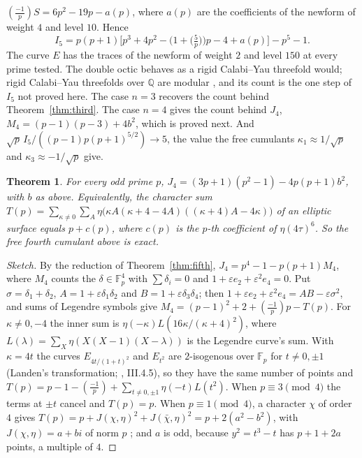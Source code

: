 \documentclass[11pt]{article}
\newtheorem{theorem}{Theorem}
\theoremstyle{remark}
\begin{document}
$(\tfrac{-1}{p})S=6p^2-19p-a(p)$, where $a(p)$ are the coefficients of the newform of
weight $4$ and level $10$. Hence
\[
I_5=p(p+1)\Big[p^3+4p^2-\big(1+\big(\tfrac5p\big)\big)p-4+a(p)\Big]-p^5-1 .
\]
The curve $E$ has the traces of the newform of weight $2$ and level $150$ at every prime tested. The double octic
behaves as a rigid Calabi--Yau threefold would; rigid Calabi--Yau threefolds over $\mathbb Q$ are modular
\cite{GouveaYui2011}, and its count is the one step of $I_5$ not proved here. The case $n=3$ recovers the count behind
Theorem~\ref{thm:third}. The case $n=4$ gives the count behind $J_4$, $M_4=(p-1)(p-3)+4b^2$, which is proved next. And
$\sqrt p\,I_5/((p-1)p(p+1)^{5/2})\to5$, the value the free cumulants $\kappa_1\approx1/\sqrt p$ and
$\kappa_3\approx-1/\sqrt p$ give.

\begin{theorem}\label{thm:fourth}
For every odd prime $p$, $J_4=(3p+1)(p^2-1)-4p(p+1)b^2$, with $b$ as above. Equivalently, the character sum
$T(p)=\sum_{\kappa\ne0}\sum_{A}\eta\big(\kappa A(\kappa+4-4A)((\kappa+4)A-4\kappa)\big)$ of an elliptic surface equals
$p+c(p)$, where $c(p)$ is the $p$-th coefficient of $\eta(4\tau)^6$. So the free fourth cumulant above is exact.
\end{theorem}
\begin{proof}[Sketch]
By the reduction of Theorem~\ref{thm:fifth}, $J_4=p^4-1-p(p+1)M_4$, where $M_4$ counts the $\delta\in\mathbb F_p^4$
with $\sum\delta_i=0$ and $1+\varepsilon e_2+\varepsilon^2e_4=0$. Put $\sigma=\delta_1+\delta_2$,
$A=1+\varepsilon\delta_1\delta_2$ and $B=1+\varepsilon\delta_3\delta_4$; then $1+\varepsilon e_2+\varepsilon^2e_4=
AB-\varepsilon\sigma^2$, and sums of Legendre symbols give $M_4=(p-1)^2+2+(\tfrac{-1}{p})p-T(p)$. For
$\kappa\ne0,-4$ the inner sum is $\eta(-\kappa)L(16\kappa/(\kappa+4)^2)$, where $L(\lambda)=\sum_X\eta(X(X-1)(X-\lambda))$
is the Legendre curve's sum. With $\kappa=4t$ the curves $E_{4t/(1+t)^2}$ and $E_{t^2}$ are $2$-isogenous over
$\mathbb F_p$ for $t\ne0,\pm1$ (Landen's transformation; \cite{Silverman}, III.4.5), so they have the same number of
points and $T(p)=p-1-(\tfrac{-1}{p})+\sum_{t\ne0,\pm1}\eta(-t)L(t^2)$. When $p\equiv3\pmod4$ the terms at $\pm t$
cancel and $T(p)=p$. When $p\equiv1\pmod4$, a character $\chi$ of order $4$ gives $T(p)=p+J(\chi,\eta)^2+J(\bar\chi,
\eta)^2=p+2(a^2-b^2)$, with $J(\chi,\eta)=a+bi$ of norm $p$ \cite{IrelandRosen}; and $a$ is odd, because $y^2=t^3-t$
has $p+1+2a$ points, a multiple of $4$.
\end{proof}
\end{document}
